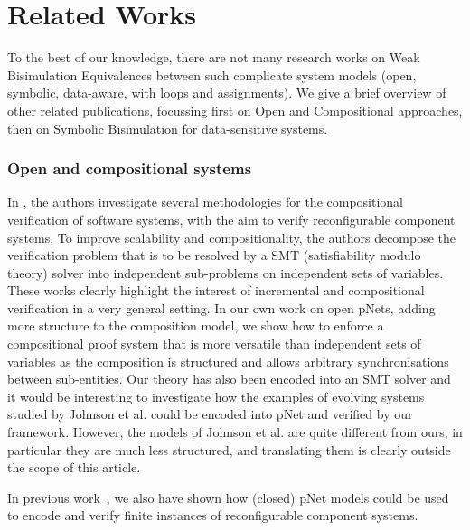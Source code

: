 \documentclass{elsarticle}
\newcommand{\TODO}[1]{\textcolor{red}{\textbf{[TODO:#1]}}}
\begin{document}
\section{Related Works}\label{sec:RW}

 To the best of our knowledge, there are not many research works on Weak Bisimulation Equivalences between such complicate system models (open, symbolic, data-aware, with loops and assignments).
We give a brief overview of other related publications, focussing first on Open and Compositional approaches, then on Symbolic Bisimulation for data-sensitive systems.



\subsubsection*{Open and compositional systems}
In
\cite{Johnson:2013:CBSE,Johnson:2014:qosa}, the authors investigate several methodologies for the compositional verification of software systems, with the aim to verify reconfigurable component systems. To improve scalability and compositionality, the authors  decompose the verification problem that is to be resolved by a SMT (satisfiability modulo theory) solver into independent sub-problems on independent sets of variables. These works clearly highlight the interest of incremental and compositional verification in a very general setting. In our own work on open pNets, adding more structure to the composition model, we show how to enforce a compositional proof system that is more versatile than independent sets of variables as the composition is  structured and allows arbitrary synchronisations between sub-entities. Our theory has also been encoded into an SMT solver and it would be interesting to investigate how the examples of evolving systems studied by Johnson et al. could be encoded into pNet and verified by our framework. However, the models of Johnson et al. are quite different from ours, in particular they are much less structured, and translating them is clearly outside the scope of this article.

In previous work~\cite{GasparHM:2013}, we also have shown how (closed) pNet models could be used to encode and verify finite instances of reconfigurable component systems. 
\end{document}

